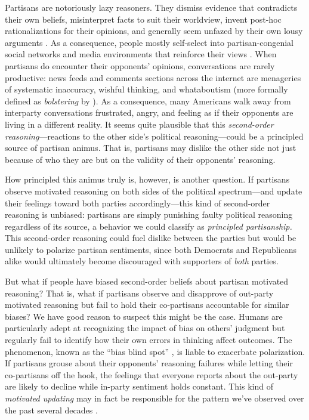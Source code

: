\documentclass[12pt, letterpaper]{article}
\begin{document}
Partisans are notoriously lazy reasoners. They dismiss evidence that contradicts their own beliefs, misinterpret facts to suit their worldview, invent post-hoc rationalizations for their opinions, and generally seem unfazed by their own lousy arguments \citep{bartels_2002,druckmanetal_2013,gainesetal_2007,taber2006}. As a consequence, people mostly self-select into partisan-congenial social networks and media environments that reinforce their views \citep{stroud_2010}. When partisans do encounter their opponents' opinions, conversations are rarely productive: news feeds and comments sections across the internet are menageries of systematic inaccuracy, wishful thinking, and whataboutism (more formally defined as \emph{bolstering} by \citeauthor{abelson1959modes} \citeyear{abelson1959modes}). As a consequence, many Americans walk away from interparty conversations frustrated, angry, and feeling as if their opponents are living in a different reality. It seems quite plausible that this \emph{second-order reasoning}---reactions to the other side's political reasoning---could be a principled source of partisan animus. That is, partisans may dislike the other side not just because of who they are but on the validity of their opponents' reasoning. 

How principled this animus truly is, however, is another question. If partisans observe motivated reasoning on both sides of the political spectrum---and update their feelings toward both parties accordingly---this kind of second-order reasoning is unbiased: partisans are simply punishing faulty political reasoning regardless of its source, a behavior we could classify as \textit{principled partisanship.} This second-order reasoning could fuel dislike between the parties but would be unlikely to polarize partisan sentiments, since both Democrats and Republicans alike would ultimately become discouraged with supporters of \emph{both} parties. 

But what if people have biased second-order beliefs about partisan motivated reasoning? That is, what if partisans observe and disapprove of out-party motivated reasoning but fail to hold their co-partisans accountable for similar biases? We have good reason to suspect this might be the case. Humans are particularly adept at recognizing the impact of bias on others' judgment but regularly fail to identify how their own errors in thinking affect outcomes. The phenomenon, known as the ``bias blind spot'' \citep{proninetal_2002,pronin_2007}, is liable to exacerbate polarization. If partisans grouse about their opponents' reasoning failures while letting their co-partisans off the hook, the feelings that everyone reports about the out-party are likely to decline while in-party sentiment holds constant. This kind of \textit{motivated updating} may in fact be responsible for the pattern we've observed over the past several decades \citep{haidthetherington_2012,IyengarSoodLelkes2012}.%
\end{document}
